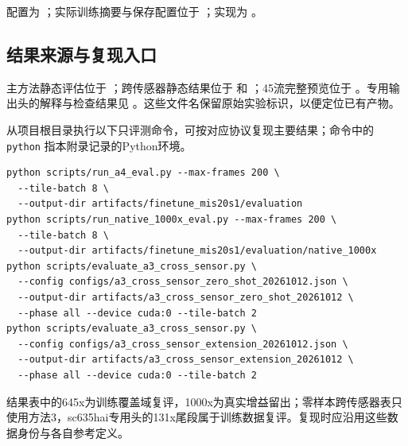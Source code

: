 \documentclass[11pt,a4paper,UTF8,fontset=fandol]{ctexart}
\begin{document}
配置为 ；实际训练摘要与保存配置位于 ；实现为 。

\subsection{结果来源与复现入口}

主方法静态评估位于 ；跨传感器静态结果位于  和 ；45流完整预览位于 。专用输出头的解释与检查结果见 。这些文件名保留原始实验标识，以便定位已有产物。

从项目根目录执行以下只评测命令，可按对应协议复现主要结果；命令中的 \texttt{python} 指本附录记录的Python环境。

{\small
\begin{verbatim}
python scripts/run_a4_eval.py --max-frames 200 \
  --tile-batch 8 \
  --output-dir artifacts/finetune_mis20s1/evaluation
python scripts/run_native_1000x_eval.py --max-frames 200 \
  --tile-batch 8 \
  --output-dir artifacts/finetune_mis20s1/evaluation/native_1000x
python scripts/evaluate_a3_cross_sensor.py \
  --config configs/a3_cross_sensor_zero_shot_20261012.json \
  --output-dir artifacts/a3_cross_sensor_zero_shot_20261012 \
  --phase all --device cuda:0 --tile-batch 2
python scripts/evaluate_a3_cross_sensor.py \
  --config configs/a3_cross_sensor_extension_20261012.json \
  --output-dir artifacts/a3_cross_sensor_extension_20261012 \
  --phase all --device cuda:0 --tile-batch 2
\end{verbatim}
}

结果表中的645x为训练覆盖域复评，1000x为真实增益留出；零样本跨传感器表只使用方法3，sc635hai专用头的131x尾段属于训练数据复评。复现时应沿用这些数据身份与各自参考定义。
\end{document}

